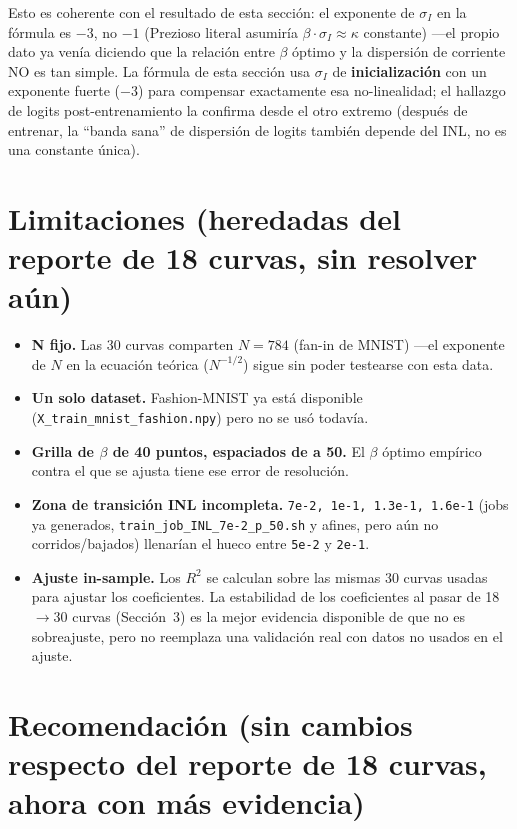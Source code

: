 \documentclass[11pt]{article}
\begin{document}
Esto es coherente con el resultado de esta sección: el exponente de
$\sigma_I$ en la fórmula es $-3$, no $-1$ (Prezioso literal asumiría
$\beta\cdot\sigma_I\approx\kappa$ constante) —el propio dato ya venía
diciendo que la relación entre $\beta$ óptimo y la dispersión de corriente
NO es tan simple. La fórmula de esta sección usa $\sigma_I$ de
\textbf{inicialización} con un exponente fuerte ($-3$) para compensar
exactamente esa no-linealidad; el hallazgo de logits post-entrenamiento la
confirma desde el otro extremo (después de entrenar, la ``banda sana'' de
dispersión de logits también depende del INL, no es una constante única).

\section{Limitaciones (heredadas del reporte de 18 curvas, sin resolver aún)}

\begin{itemize}
\item \textbf{N fijo.} Las 30 curvas comparten $N=784$ (fan-in de MNIST)
  —el exponente de $N$ en la ecuación teórica ($N^{-1/2}$) sigue sin poder
  testearse con esta data.
\item \textbf{Un solo dataset.} Fashion-MNIST ya está disponible
  (\texttt{X\_train\_mnist\_fashion.npy}) pero no se usó todavía.
\item \textbf{Grilla de $\beta$ de 40 puntos, espaciados de a 50.} El
  $\beta$ óptimo empírico contra el que se ajusta tiene ese error de
  resolución.
\item \textbf{Zona de transición INL incompleta.} \texttt{7e-2, 1e-1,
  1.3e-1, 1.6e-1} (jobs ya generados, \texttt{train\_job\_INL\_7e-2\_p\_50.sh}
  y afines, pero aún no corridos/bajados) llenarían el hueco entre
  \texttt{5e-2} y \texttt{2e-1}.
\item \textbf{Ajuste in-sample.} Los $R^2$ se calculan sobre las mismas 30
  curvas usadas para ajustar los coeficientes. La estabilidad de los
  coeficientes al pasar de 18$\to$30 curvas (Sección~3) es la mejor
  evidencia disponible de que no es sobreajuste, pero no reemplaza una
  validación real con datos no usados en el ajuste.
\end{itemize}

\section{Recomendación (sin cambios respecto del reporte de 18 curvas, ahora con más evidencia)}
\end{document}
